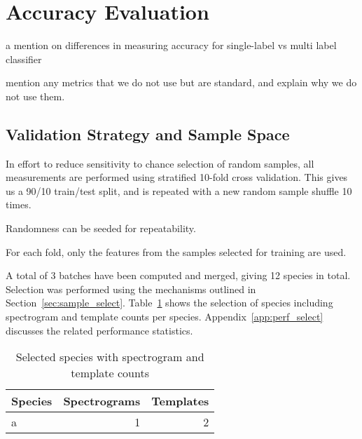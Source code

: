 \section{Accuracy Evaluation}

a mention on differences in measuring accuracy for single-label vs multi
label classifier

mention any metrics that we do not use but are standard, and explain
why we do not use them.

\subsection{Validation Strategy and Sample Space}
In effort to reduce sensitivity to chance selection of random samples, all
measurements are performed using stratified 10-fold cross validation.
This gives us a 90/10 train/test split, and is repeated with a new random sample
shuffle 10 times.

Randomness can be seeded for repeatability.

For each fold, only the features from the samples selected for training are
used.

A total of 3 batches have been computed and merged, giving 12 species in total.
Selection was performed using the mechanisms outlined in
Section~\ref{sec:sample_select}.
Table~\ref{tbl:used_data} shows the selection of species including spectrogram
and template counts per species.
Appendix~\ref{app:perf_select} discusses the related performance statistics.

\begin{table}[!htb]
  \caption{Selected species with spectrogram and template counts}
  \label{tbl:used_data}
  \centering
  \begin{tabular}{l r r}
    Species & Spectrograms & Templates \\ \hline
    a & 1 & 2
  \end{tabular}
\end{table}

